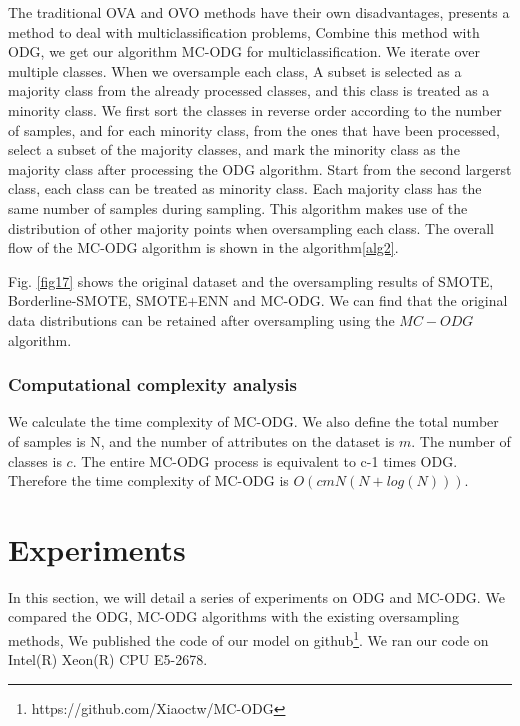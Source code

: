 \documentclass[runningheads]{llncs}
\begin{document}
The traditional OVA and OVO methods have their own disadvantages, 
 \cite{2020Combined,2019Radial} presents a method to deal with multiclassification problems,
Combine this method with ODG, we get our algorithm MC-ODG for multiclassification.
We iterate over multiple classes. When we oversample each class,
A subset is selected as a majority class from the already processed classes, 
and this class is treated as a minority class.
We first sort the classes in reverse order according to the number of samples, and for each minority class, 
from the ones that have been processed,
select a subset of the majority classes, and mark the minority class as the majority class 
after processing the ODG algorithm.
Start from the second largerst class, each class can be treated as minority class.
Each majority class has the same number of samples during sampling.
This algorithm makes use of the distribution of 
other majority points when oversampling each class.
The overall flow of the MC-ODG algorithm is shown in the algorithm\ref{alg2}.


 Fig. \ref{fig17} shows the original dataset and the oversampling results of SMOTE, Borderline-SMOTE,
 SMOTE+ENN and MC-ODG. We can find that the original data distributions 
 can be retained after oversampling using the $MC-ODG$ algorithm.

 \subsubsection{Computational complexity analysis}
We calculate the time complexity of MC-ODG.
 We also define the total number of samples is N, and the number of attributes on the dataset is $m$.
 The number of classes is $c$. The entire MC-ODG process is equivalent to c-1 times ODG.
 Therefore the time complexity of MC-ODG is $O(cmN(N+log(N)))$.
\section{Experiments}
In this section, we will detail a series of experiments on ODG and MC-ODG.
We compared the ODG, MC-ODG algorithms with the existing oversampling methods,
We published the code of our model on github\footnote{https://github.com/Xiaoctw/MC-ODG}.
We ran our code on Intel(R) Xeon(R) CPU E5-2678.
\end{document}
